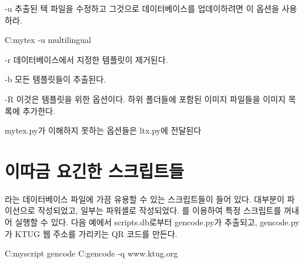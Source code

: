\begin{macros}
\coderead[language=ini]

\item[-u] 추출된 텍 파일을 수정하고 그것으로 데이터베이스를 업데이하려면 이 옵션을 사용하라.

\begin{code}
C:\>mytex -u multilingual
\end{code}

\item[-r] 데이터베이스에서 지정한 템플릿이 제거된다.
\item[-b] 모든 템플릿들이 추출된다.
\item[-R] 이것은  템플릿을 위한 옵션이다. 하위 폴더들에 포함된 이미지 파일들을 이미지 목록에 추가한다.
\end{macros}

mytex.py가 이해하지 못하는 옵션들은 ltx.py에 전달된다

\section{이따금 요긴한 스크립트들}\label{sec:myscript}

라는 데이터베이스 파일에 가끔 유용할 수 있는 스크립트들이 들어 있다. 
대부분이 파이선으로 작성되었고, 일부는 파워셸로 작성되었다.
를 이용하여 특정 스크립트를 꺼내어 실행할 수 있다.
다음 예에서 scripts.db로부터 gencode.py가 추출되고, gencode.py가 KTUG 웹 주소를 가리키는 QR 코드를 만든다.

\begin{code}
C:\>myscript gencode
C:\>gencode -q www.ktug.org
\end{code}

